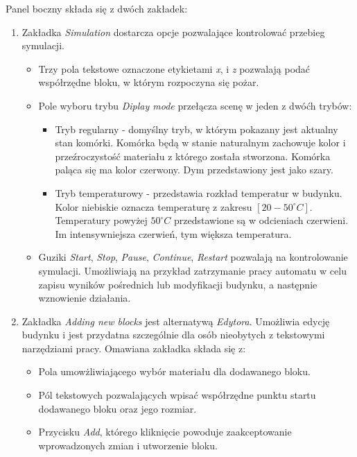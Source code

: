 Panel boczny składa się z dwóch zakładek:
\begin {enumerate}
\item Zakładka \textit{Simulation} dostarcza opcje pozwalające kontrolować przebieg symulacji.
\begin {itemize}
	\item Trzy pola tekstowe oznaczone etykietami \textit{x}, i \textit{z} pozwalają podać współrzędne bloku, w którym rozpoczyna się pożar.
	\item Pole wyboru trybu \textit{Diplay mode} przełącza scenę w jeden z dwóćh trybów:
	\begin{itemize}
	\item Tryb regularny - domyślny tryb, w którym pokazany jest aktualny stan komórki. Komórka będą w stanie naturalnym zachowuje kolor i przeźroczystość materiału z którego została stworzona. Komórka paląca się ma kolor czerwony. Dym przedstawiony jest jako szary.
	\item Tryb temperaturowy - przedstawia rozkład temperatur w budynku. Kolor niebiskie oznacza temperaturę z zakresu $[20-50^\circ C]$. Temperatury powyżej $50^\circ C$ przedstawione są w odcieniach czerwieni. Im intensywniejsza czerwień, tym większa temperatura.
\end{itemize}
	\item Guziki \textit {Start}, \textit{Stop}, \textit{Pause}, \textit{Continue}, \textit {Restart} pozwalają na kontrolowanie symulacji. Umożliwiają na przykład zatrzymanie pracy automatu w celu zapisu wyników pośrednich lub modyfikacji budynku, a następnie wznowienie działania.
	\end{itemize}
\item Zakładka \textit{Adding new blocks} jest alternatywą \textit{Edytora}. Umożliwia edycję budynku i jest przydatna szczególnie dla osób nieobytych z tekstowymi narzędziami pracy. Omawiana zakładka składa się z:
\begin {itemize}
\item Pola umowżliwiającego wybór materiału dla dodawanego bloku.
\item Pól tekstowych pozwalających wpisać współrzędne punktu startu dodawanego bloku oraz jego rozmiar.
\item Przycisku \textit{Add}, którego kliknięcie powoduje zaakceptowanie wprowadzonych zmian i utworzenie bloku.
\end {itemize}
\end {enumerate}
 

